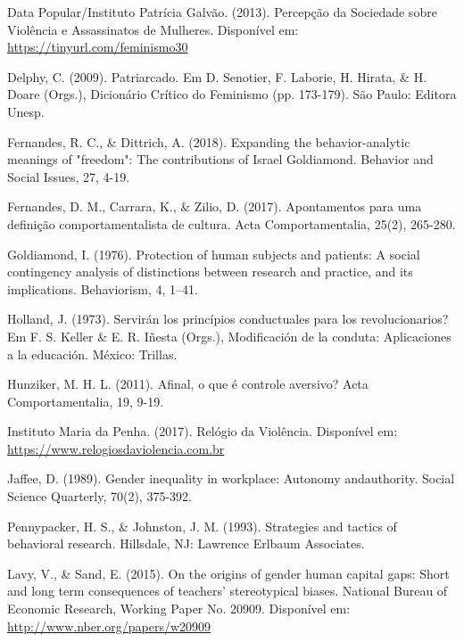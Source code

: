 \hangindent=25pt
\noindent Data Popular/Instituto Patrícia Galvão. (2013). Percepção da Sociedade sobre Violência e Assassinatos de Mulheres. Disponível em: 
\url{https://tinyurl.com/feminismo30}

\hangindent=25pt
\noindent Delphy, C. (2009). Patriarcado. Em D. Senotier, F. Laborie, H. Hirata, \& H. Doare (Orgs.), Dicionário Crítico do Feminismo (pp. 173-179). São Paulo: Editora Unesp.

\hangindent=25pt
\noindent Fernandes, R. C., \& Dittrich, A. (2018). Expanding the behavior-analytic meanings of "freedom": The contributions of Israel Goldiamond. Behavior and Social Issues, 27, 4-19.

\hangindent=25pt
\noindent Fernandes, D. M., Carrara, K., \& Zilio, D. (2017). Apontamentos para uma definição comportamentalista de cultura. Acta Comportamentalia, 25(2), 265-280.

\hangindent=25pt
\noindent Goldiamond, I. (1976). Protection of human subjects and patients: A social contingency analysis of distinctions between research and practice, and its implications. Behaviorism, 4, 1–41.

\hangindent=25pt
\noindent Holland, J. (1973). Servirán los princípios conductuales para los revolucionarios? Em F. S. Keller \& E. R. Iñesta (Orgs.), Modificación de la conduta: Aplicaciones a la educación. México: Trillas.

\hangindent=25pt
\noindent Hunziker, M. H. L. (2011). Afinal, o que é controle aversivo? Acta Comportamentalia, 19, 9-19.

\hangindent=25pt
\noindent Instituto Maria da Penha. (2017). Relógio da Violência. Disponível em: \url{https://www.relogiosdaviolencia.com.br}

\hangindent=25pt
\noindent Jaffee, D. (1989). Gender inequality in workplace: Autonomy and\linebreak authority. Social Science Quarterly, 70(2), 375-392.

\hangindent=25pt
\noindent Pennypacker, H. S., \& Johnston, J. M. (1993). Strategies and tactics of behavioral research. Hillsdale, NJ: Lawrence Erlbaum Associates.

\hangindent=25pt
\noindent Lavy, V., \& Sand, E. (2015). On the origins of gender human capital gaps: Short and long term consequences of teachers’ stereotypical biases. National Bureau of Economic Research, Working Paper No. 20909. Disponível em: \url{http://www.nber.org/papers/w20909}

